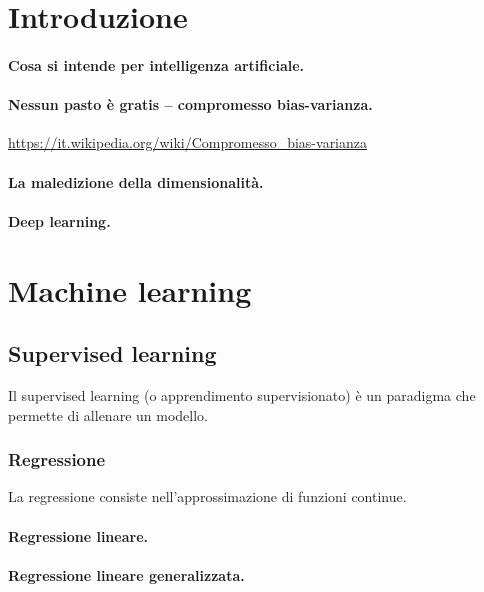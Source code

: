 \section{Introduzione}
\paragraph{Cosa si intende per intelligenza artificiale.}
\paragraph{Nessun pasto è gratis -- compromesso bias-varianza.}
\href{https://it.wikipedia.org/wiki/Compromesso\_bias-varianza}{https://it.wikipedia.org/wiki/Compromesso\_bias-varianza}
\paragraph{La maledizione della dimensionalità.}
\paragraph{Deep learning.}

\section{Machine learning}


\subsection{Supervised learning}
Il supervised learning (o apprendimento supervisionato) è un paradigma che permette di allenare un modello.

\subsubsection{Regressione}
La regressione consiste nell'approssimazione di funzioni continue.
\paragraph{Regressione lineare.}
\paragraph{Regressione lineare generalizzata.}

